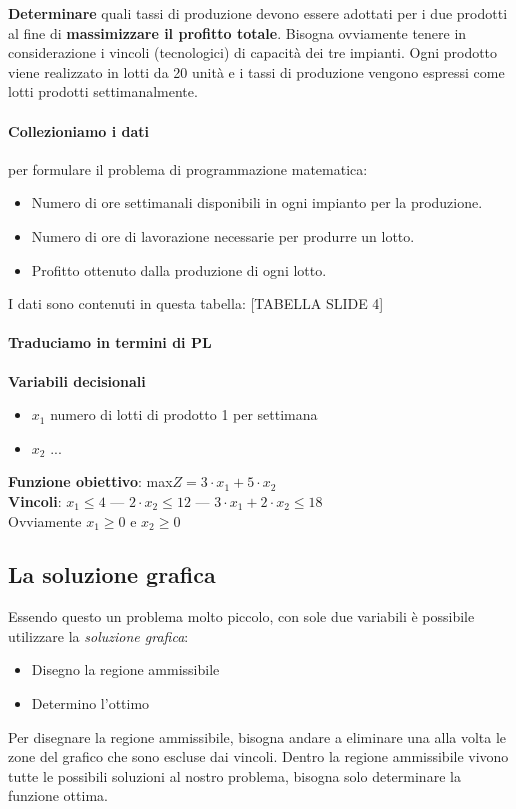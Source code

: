 \documentclass[12pt, a4paper, openany]{book}
\begin{document}
\textbf{Determinare} quali tassi di produzione devono essere adottati per i due prodotti al fine di \textbf{massimizzare il profitto totale}.
Bisogna ovviamente tenere in considerazione i vincoli (tecnologici) di capacità dei tre impianti.
Ogni prodotto viene realizzato in lotti da 20 unità e i tassi di produzione vengono espressi come lotti prodotti settimanalmente.

\paragraph*{Collezioniamo i dati} per formulare il problema di programmazione matematica:
\begin{itemize}
    \item Numero di ore settimanali disponibili in ogni impianto per la produzione.
    \item Numero di ore di lavorazione necessarie per produrre un lotto.
    \item Profitto ottenuto dalla produzione di ogni lotto.
\end{itemize}
I dati sono contenuti in questa tabella: [TABELLA SLIDE 4]

\paragraph*{Traduciamo in termini di PL}
\textbf{Variabili decisionali}
\begin{itemize}
    \item $x_1$ numero di lotti di prodotto 1 per settimana
    \item $x_2$ ...
\end{itemize}
\textbf{Funzione obiettivo}: max$Z = 3 \cdot x_1 + 5 \cdot x_2$
\\\textbf{Vincoli}: $x_1\leq 4$ --- $2 \cdot x_2 \leq 12$ --- $3\cdot x_1 + 2\cdot x_2 \leq 18$
\\Ovviamente $x_1 \geq 0$ e $x_2 \geq 0$

\subsection*{La soluzione grafica} Essendo questo un problema molto piccolo, con sole due variabili è possibile utilizzare la \emph{soluzione grafica}:
\begin{itemize}
    \item Disegno la regione ammissibile
    \item Determino l'ottimo
\end{itemize} 
Per disegnare la regione ammissibile, bisogna andare a eliminare una alla volta le zone del grafico che sono escluse dai vincoli.
Dentro la regione ammissibile vivono tutte le possibili soluzioni al nostro problema, bisogna solo determinare la funzione ottima.
\end{document}
